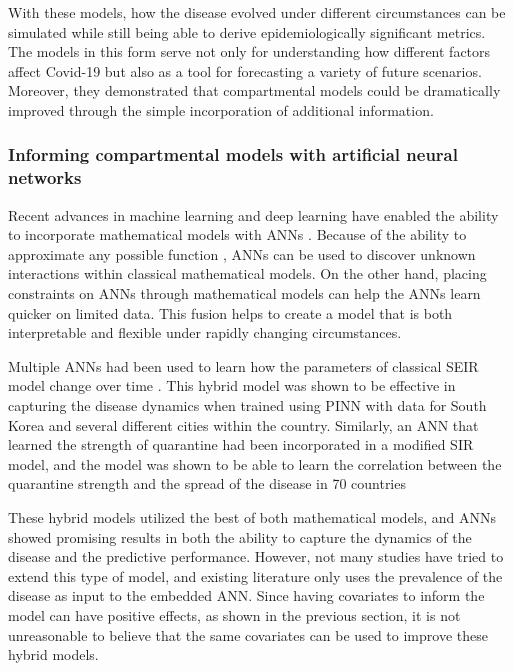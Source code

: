 With these models, how the disease evolved under different circumstances can be simulated while still being able to derive epidemiologically significant metrics.
The models in this form serve not only for understanding how different factors affect Covid-19 but also as a tool for forecasting a variety of future scenarios.
Moreover, they demonstrated that compartmental models could be dramatically improved through the simple incorporation of additional information.

\subsubsection{Informing compartmental models with artificial neural networks}

Recent advances in machine learning and deep learning have enabled the ability to incorporate mathematical models with \glspl{ANN} \cite{raissiPhysicsinformedNeuralNetworks2019, chenNeuralOrdinaryDifferential2019, rackauckasUniversalDifferentialEquations2020}.
Because of the ability to approximate any possible function \cite{cybenkotApproximationSuperpositionsSigmoidal, hornikApproximationCapabilitiesMultilayer1991, hornikMultilayerFeedforwardNetworks1989}, \glspl{ANN} can be used to discover unknown interactions within classical mathematical models.
On the other hand, placing constraints on \glspl{ANN} through mathematical models can help the \glspl{ANN} learn quicker on limited data.
This fusion helps to create a model that is both interpretable and flexible under rapidly changing circumstances.

Multiple \glspl{ANN} had been used to learn how the parameters of classical \gls{SEIR} model change over time \cite{jungRealWorldImplicationsRapidly2020}.
This hybrid model was shown to be effective in capturing the disease dynamics when trained using \gls{PINN} \cite{raissiPhysicsinformedNeuralNetworks2019} with data for South Korea and several different cities within the country.
Similarly, an \gls{ANN} that learned the strength of quarantine had been incorporated in a modified \gls{SIR} model, and the model was shown to be able to learn the correlation between the quarantine strength and the spread of the disease in 70 countries \cite{dandekarMachineLearningAidedGlobal2020a}

These hybrid models utilized the best of both mathematical models, and \glspl{ANN} showed promising results in both the ability to capture the dynamics of the disease and the predictive performance.
However, not many studies have tried to extend this type of model, and existing literature only uses the prevalence of the disease as input to the embedded \gls{ANN}.
Since having covariates to inform the model can have positive effects, as shown in the previous section, it is not unreasonable to believe that the same covariates can be used to improve these hybrid models.